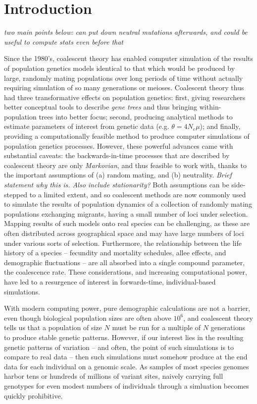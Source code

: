\documentclass{article}
\newcommand{\plr}[1]{{\em \color{blue} #1}}
\begin{document}
\section*{Introduction}

\plr{two main points below: can put down neutral mutations afterwards, and could be useful to compute stats even before that}

Since the 1980's, coalescent theory has enabled computer simulation of the results of population genetics models
identical to that which would be produced by large, randomly mating populations over long periods of time
without actually requiring simulation of so many generations or meioses.
Coalescent theory thus had three transformative effects on population genetics:
first, giving researchers better conceptual tools to describe \emph{gene trees} and thus bringing within-population trees into better focus;
second, producing analytical methods to estimate parameters of interest from genetic data (e.g. $\theta = 4N_e \mu$);
and finally, providing a computationally feasible method to produce computer simulations of population genetics processes.
However, these powerful advances came with substantial caveats:
the backwards-in-time processes that are described by coalescent theory
are only \emph{Markovian}, and thus feasible to work with,
thanks to the important assumptions of (a) random mating, and (b) neutrality.
\plr{Brief statement why this is.  Also include stationarity?}
Both assumptions can be side-stepped to a limited extent, and so coalescent methods are now commonly used to
simulate the results of population dynamics of a collection of randomly mating populations exchanging migrants,
having a small number of loci under selection.
Mapping results of such models onto real species can be challenging,
as these are often distributed across geographical space and may have large numbers of loci under various sorts of selection.
Furthermore, the relationship between the life history of a species --
fecundity and mortality schedules, allee effects, and demographic fluctuations --
are all absorbed into a single compound parameter, the coalescence rate.
These considerations, and increasing computational power, have led to a resurgence of interest in forwards-time, individual-based simulations.

With modern computing power, pure demographic calculations are not a barrier,
even though biological population sizes are often above $10^6$,
and coalescent theory tells us that a population of size $N$ 
must be run for a multiple of $N$ generations to produce stable genetic patterns.
However, if our interest lies in the resulting genetic patterns of variation
-- and often, the point of such simulations is to compare to real data --
then such simulations must somehow produce at the end data for each individual on a genomic scale.
As samples of most species genomes harbor tens or hundreds of millions of variant sites,
naively carrying full genotypes for even modest numbers of individuals through a simluation becomes quickly prohibitive.
\end{document}
